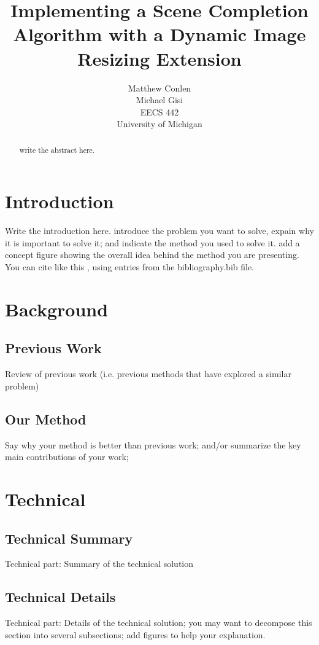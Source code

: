 \documentclass[11pt]{amsart}
\title{Implementing a Scene Completion Algorithm with a Dynamic Image Resizing Extension}
\author{Matthew Conlen \\ Michael Gisi  \\ EECS 442 \\ University of Michigan}
\date{}                                           %
\begin{document}
\maketitle

\begin{abstract}
write the abstract here. 
\end{abstract}

\section{Introduction}

Write the introduction here.  introduce the problem you want to solve, expain why it is important to solve it; and indicate the method you used to solve it. add a concept figure showing the overall idea behind the method you are presenting. You can cite like this \cite{Hays:2007, Karger:1992, Avidan:2007, Torralba:2006, Perez:2003}, using entries from the bibliography.bib file.

\section{Background} 
\subsection{Previous Work}
Review of previous work (i.e. previous methods that have explored a similar problem)

\subsection{Our Method}
Say why your method is better than previous work; and/or summarize the key main contributions of your work; 

\section{Technical}

\subsection{Technical Summary}
Technical part: Summary of the technical solution 

\subsection{Technical Details}
Technical part: Details of the technical solution; you may want to decompose this section into several subsections; add figures to help your explanation. 
\end{document}
